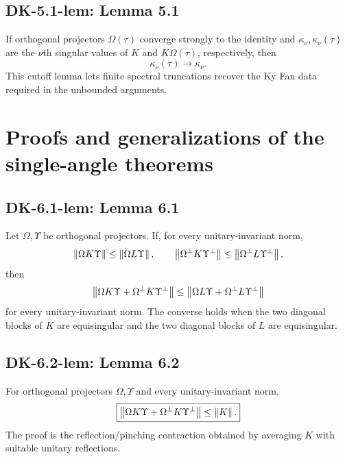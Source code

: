 \subsection*{DK-5.1-lem: Lemma 5.1}
If orthogonal projectors $\Omega(\tau)$ converge strongly to the identity and $\kappa_\nu,\kappa_\nu(\tau)$ are the $\nu$th singular values of $K$ and $K\Omega(\tau)$, respectively, then
\[
 \kappa_\nu(\tau)\longrightarrow\kappa_\nu.
\]
This cutoff lemma lets finite spectral truncations recover the Ky Fan data required in the unbounded arguments.

\section{Proofs and generalizations of the single-angle theorems}

\subsection*{DK-6.1-lem: Lemma 6.1}
Let $\Omega,\Upsilon$ be orthogonal projectors.  If, for every unitary-invariant norm,
\[
 \left\lVert \Omega K\Upsilon\right\rVert\le\left\lVert \Omega L\Upsilon\right\rVert,
 \qquad
 \left\lVert \Omega^\perp K\Upsilon^\perp\right\rVert\le\left\lVert \Omega^\perp L\Upsilon^\perp\right\rVert,
\]
then
\[
 \left\lVert \Omega K\Upsilon+\Omega^\perp K\Upsilon^\perp\right\rVert
 \le
 \left\lVert \Omega L\Upsilon+\Omega^\perp L\Upsilon^\perp\right\rVert
\]
for every unitary-invariant norm.  The converse holds when the two diagonal blocks of $K$ are equisingular and the two diagonal blocks of $L$ are equisingular.

\subsection*{DK-6.2-lem: Lemma 6.2}
For orthogonal projectors $\Omega,\Upsilon$ and every unitary-invariant norm,
\[
 \boxed{\left\lVert \Omega K\Upsilon+\Omega^\perp K\Upsilon^\perp\right\rVert\le\left\lVert K\right\rVert.}
\]
The proof is the reflection/pinching contraction obtained by averaging $K$ with suitable unitary reflections.

